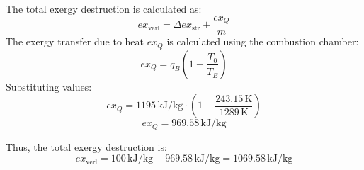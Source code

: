 The total exergy destruction is calculated as:  
\[
ex_{\text{verl}} = \Delta ex_{\text{str}} + \frac{ex_Q}{\dot{m}}
\]  
The exergy transfer due to heat \( ex_Q \) is calculated using the combustion chamber:  
\[
ex_Q = q_B \left( 1 - \frac{T_0}{\bar{T}_B} \right)
\]  
Substituting values:  
\[
ex_Q = 1195 \, \text{kJ/kg} \cdot \left( 1 - \frac{243.15 \, \text{K}}{1289 \, \text{K}} \right)
\]  
\[
ex_Q = 969.58 \, \text{kJ/kg}
\]  

Thus, the total exergy destruction is:  
\[
ex_{\text{verl}} = 100 \, \text{kJ/kg} + 969.58 \, \text{kJ/kg} = 1069.58 \, \text{kJ/kg}
\]